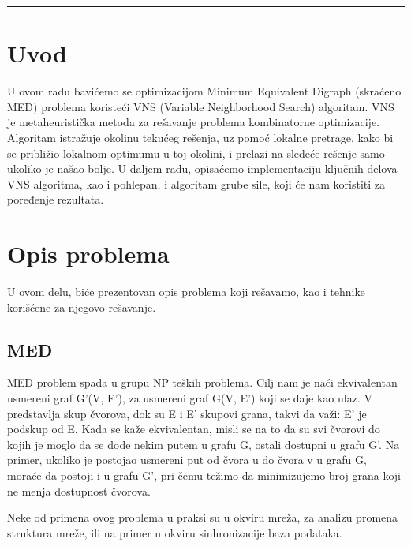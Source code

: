 \documentclass{article}
\begin{document}
\bigskip

\hrule

\bigskip

\newpage

\section{\huge Uvod}\label{sec:uvod}
\fontsize{14}{14}\selectfont
U ovom radu bavićemo se optimizacijom Minimum Equivalent Digraph (skraćeno MED) problema koristeći VNS (Variable Neighborhood Search) algoritam.
\newline
\newline
VNS je metaheuristička metoda za rešavanje problema kombinatorne optimizacije. Algoritam istražuje okolinu tekućeg rešenja, uz pomoć lokalne pretrage, kako bi se približio lokalnom optimumu u toj okolini, i prelazi na sledeće rešenje samo ukoliko je našao bolje.
\newline
\newline
U daljem radu, opisaćemo implementaciju ključnih delova VNS algoritma, kao i pohlepan, i algoritam grube sile, koji će nam koristiti za poređenje rezultata.



\newpage
\section{\huge Opis problema}\label{sec:opis}
U ovom delu, biće prezentovan opis problema koji rešavamo, kao i tehnike korišćene za njegovo rešavanje.

\subsection{\huge MED}\label{sec:med}
MED problem spada u grupu NP teških problema.
Cilj nam je naći ekvivalentan usmereni graf G'(V, E'), za usmereni graf G(V, E') koji se daje kao ulaz. V predstavlja skup čvorova, dok su E i E' skupovi grana, takvi da važi: E' je podskup od E. Kada se kaže ekvivalentan, misli se na to da su svi čvorovi do kojih je moglo da se dođe nekim putem u grafu G, ostali dostupni u grafu G'. Na primer, ukoliko je postojao usmereni put od čvora u do čvora v u grafu G, moraće da postoji i u grafu G', pri čemu težimo da minimizujemo broj grana koji ne menja dostupnost čvorova.
\newline

Neke od primena ovog problema u praksi su u okviru mreža, za analizu promena struktura mreže, ili na primer u okviru sinhronizacije baza podataka.
\newline
\end{document}
